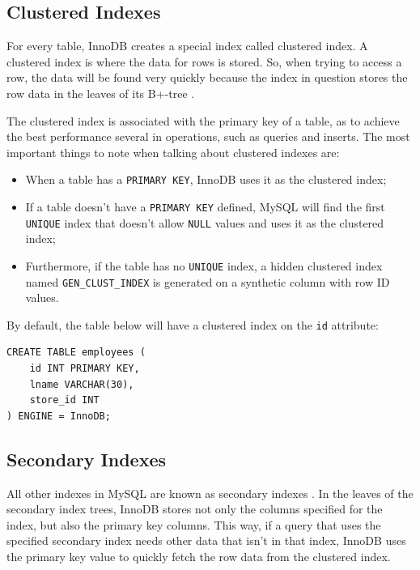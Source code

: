 \documentclass[12pt]{article}
\begin{document}
\subsection{Clustered Indexes}
For every table, InnoDB creates a special index called clustered index. A clustered index is where the data for rows is stored. So, when trying to access a row, the data will be found very quickly because the index in question stores the row data in the leaves of its B+-tree \parencite{ClusteredSecondaryIndexes}.

The clustered index is associated with the primary key of a table, as to achieve the best performance several in operations, such as queries and inserts. The most important things to note when talking about clustered indexes are:

\begin{itemize}
    \item When a table has a \verb|PRIMARY KEY|, InnoDB uses it as the clustered index;
    
    \item If a table doesn't have a \verb|PRIMARY KEY| defined, MySQL will find the first \verb|UNIQUE| index that doesn't allow \verb|NULL| values and uses it as the clustered index;
    
    \item Furthermore, if the table has no \verb|UNIQUE| index, a hidden clustered index named \verb|GEN_CLUST_INDEX| is generated on a synthetic column with row ID values.
    
\end{itemize}

\noindent By default, the table below will have a clustered index on the \verb|id| attribute:
\begin{verbatim}
CREATE TABLE employees (
    id INT PRIMARY KEY,
    lname VARCHAR(30),
    store_id INT
) ENGINE = InnoDB;
\end{verbatim}


\subsection{Secondary Indexes}
\label{secondaryIndexes}
All other indexes in MySQL are known as secondary indexes \parencite{PhysicalStructIndex}. In the leaves of the secondary index trees, InnoDB stores not only the columns specified for the index, but also the primary key columns. This way, if a query that uses the specified secondary index needs other data that isn't in that index, InnoDB uses the primary key value to quickly fetch the row data from the clustered index.
\vspace{0.3cm}
\end{document}
